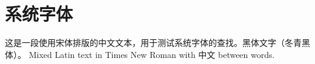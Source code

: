 \documentclass{article}
\begin{document}
\section{系统字体}
这是一段使用宋体排版的中文文本，用于测试系统字体的查找。\textsf{黑体文字（冬青黑体）}。
Mixed Latin text in Times New Roman with 中文 between words.
\end{document}
